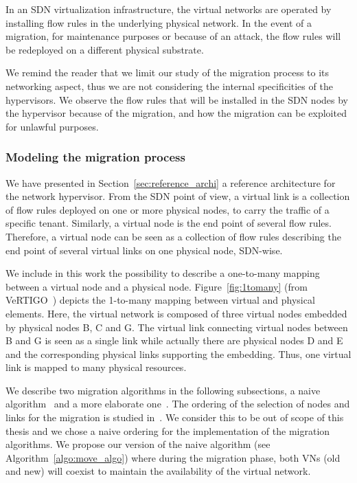 \label{sec:model-migration}
In an SDN virtualization infrastructure, the virtual networks are operated by installing flow rules in the underlying physical network.
In the event of a migration, for maintenance purposes or because of an attack, the flow rules will be redeployed on a different physical substrate.

We remind the reader that we limit our study of the migration process to its networking aspect, thus we are not considering the internal specificities of the hypervisors.
We observe the flow rules that will be installed in the SDN nodes by the hypervisor because of the migration, and how the migration can be exploited for unlawful purposes.



\subsubsection{Modeling the migration process}
We have presented in Section~\ref{sec:reference_archi} a reference architecture for the network hypervisor.
From the SDN point of view, a virtual link is a collection of flow rules deployed on one or more physical nodes, to carry the traffic of a specific tenant.
Similarly, a virtual node is the end point of several flow rules.
Therefore, a virtual node can be seen as a collection of flow rules describing the end point of several virtual links on one physical node, SDN-wise.

We include in this work the possibility to describe a one-to-many mapping between a virtual node and a physical node.
Figure~\ref{fig:1tomany} (from VeRTIGO~\cite{VeRTIGO-Corin2012a}) depicts the 1-to-many mapping between virtual and physical elements. Here, the virtual network is composed of three virtual nodes embedded by physical nodes B, C and G.
The virtual link connecting virtual nodes between B and G is seen as a single link while actually there are physical nodes D and E and the corresponding physical links supporting the embedding.
Thus, one virtual link is mapped to many physical resources.

We describe two migration algorithms in the following subsections, a naive algorithm~\cite{Lime-Ghorbani2014} and a more elaborate one~\cite{vnm-lo2013}. 
The ordering of the selection of nodes and links for the migration is studied in~\cite{vnm-lo2013}. 
We consider this to be out of scope of this thesis and we chose a naive ordering for the implementation of the migration algorithms.
We propose our version of the naive algorithm (see Algorithm~\ref{algo:move_algo}) where during the migration phase, both VNs (old and new) will coexist to maintain the availability of the virtual network.


